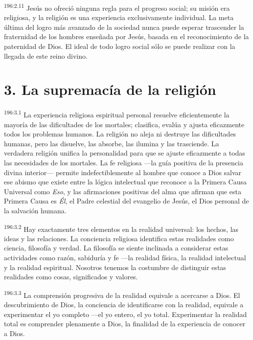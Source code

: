 \par 
\textsuperscript{196:2.11} Jesús no ofreció ninguna regla para el progreso social; su misión era religiosa, y la religión es una experiencia exclusivamente individual. La meta última del logro más avanzado de la sociedad nunca puede esperar trascender la fraternidad de los hombres enseñada por Jesús, basada en el reconocimiento de la paternidad de Dios. El ideal de todo logro social sólo se puede realizar con la llegada de este reino divino.

\section*{3. La supremacía de la religión}
\par 
\textsuperscript{196:3.1} La experiencia religiosa espiritual personal resuelve eficientemente la mayoría de las dificultades de los mortales; clasifica, evalúa y ajusta eficazmente todos los problemas humanos. La religión no aleja ni destruye las dificultades humanas, pero las disuelve, las absorbe, las ilumina y las trasciende. La verdadera religión unifica la personalidad para que se ajuste eficazmente a todas las necesidades de los mortales. La fe religiosa ---la guía positiva de la presencia divina interior--- permite indefectiblemente al hombre que conoce a Dios salvar ese abismo que existe entre la lógica intelectual que reconoce a la Primera Causa Universal como \textit{Eso}, y las afirmaciones positivas del alma que afirman que esta Primera Causa es \textit{Él}, el Padre celestial del evangelio de Jesús, el Dios personal de la salvación humana.

\par 
\textsuperscript{196:3.2} Hay exactamente tres elementos en la realidad universal: los hechos, las ideas y las relaciones. La conciencia religiosa identifica estas realidades como ciencia, filosofía y verdad. La filosofía se siente inclinada a considerar estas actividades como razón, sabiduría y fe ---la realidad física, la realidad intelectual y la realidad espiritual. Nosotros tenemos la costumbre de distinguir estas realidades como cosas, significados y valores.

\par 
\textsuperscript{196:3.3} La comprensión progresiva de la realidad equivale a acercarse a Dios. El descubrimiento de Dios, la conciencia de identificarse con la realidad, equivale a experimentar el yo completo ---el yo entero, el yo total. Experimentar la realidad total es comprender plenamente a Dios, la finalidad de la experiencia de conocer a Dios.

